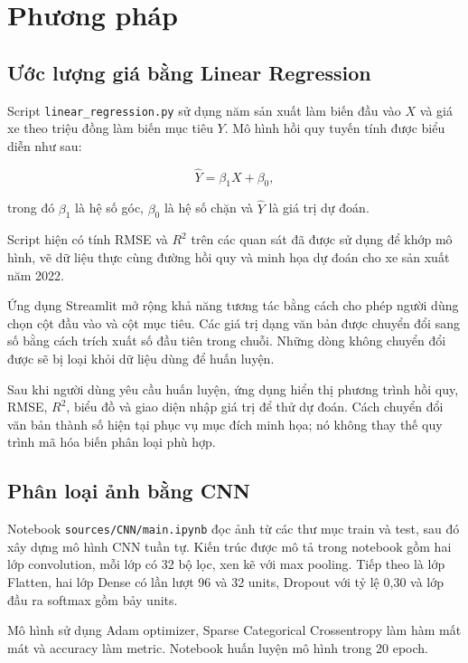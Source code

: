 \documentclass[runningheads]{llncs}
\begin{document}
\section{Phương pháp}

\subsection{Ước lượng giá bằng Linear Regression}

Script \texttt{linear\_regression.py} sử dụng năm sản xuất
làm biến đầu vào $X$ và giá xe theo triệu đồng làm biến
mục tiêu $Y$. Mô hình hồi quy tuyến tính được biểu diễn
như sau:

\begin{equation}
    \widehat{Y} = \beta_1 X + \beta_0,
\end{equation}

trong đó $\beta_1$ là hệ số góc, $\beta_0$ là hệ số chặn
và $\widehat{Y}$ là giá trị dự đoán.

Script hiện có tính RMSE và $R^2$ trên các quan sát đã
được sử dụng để khớp mô hình, vẽ dữ liệu thực cùng đường
hồi quy và minh họa dự đoán cho xe sản xuất năm 2022.

Ứng dụng Streamlit mở rộng khả năng tương tác bằng cách
cho phép người dùng chọn cột đầu vào và cột mục tiêu.
Các giá trị dạng văn bản được chuyển đổi sang số bằng
cách trích xuất số đầu tiên trong chuỗi. Những dòng
không chuyển đổi được sẽ bị loại khỏi dữ liệu dùng để
huấn luyện.

Sau khi người dùng yêu cầu huấn luyện, ứng dụng hiển thị
phương trình hồi quy, RMSE, $R^2$, biểu đồ và giao diện
nhập giá trị để thử dự đoán. Cách chuyển đổi văn bản
thành số hiện tại phục vụ mục đích minh họa; nó không
thay thế quy trình mã hóa biến phân loại phù hợp.

\subsection{Phân loại ảnh bằng CNN}

Notebook \texttt{sources/CNN/main.ipynb} đọc ảnh từ các
thư mục train và test, sau đó xây dựng mô hình CNN tuần tự.
Kiến trúc được mô tả trong notebook gồm hai lớp convolution,
mỗi lớp có 32 bộ lọc, xen kẽ với max pooling. Tiếp theo
là lớp Flatten, hai lớp Dense có lần lượt 96 và 32 units,
Dropout với tỷ lệ 0,30 và lớp đầu ra softmax gồm bảy units.

Mô hình sử dụng Adam optimizer, Sparse Categorical
Crossentropy làm hàm mất mát và accuracy làm metric.
Notebook huấn luyện mô hình trong 20 epoch.
\end{document}
